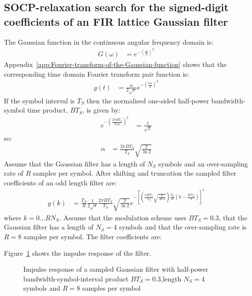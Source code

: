 \documentclass[a4paper,twoside,10pt,english]{report}
\begin{document}
\subsection{\label{sec:SOCP-relaxation-search-signed-digit-coefficients-FIR-Gaussian}SOCP-relaxation search for the signed-digit coefficients of an FIR lattice Gaussian filter}
The Gaussian function in the continuous angular frequency domain is:
\begin{align*}
  G\left(\omega\right)&=e^{-\left(\frac{\omega}{\alpha}\right)^{2}}
\end{align*}
Appendix~\ref{app:Fourier-transform-of-the-Gaussian-function} shows that
the corresponding time domain Fourier transform pair function is:
\begin{align*}
  g\left(t\right)&=\frac{\alpha}{2\sqrt{\pi}}e^{-\left(\frac{t\alpha}{2}\right)^{2}}
\end{align*}
If the symbol interval is $T_{S}$ then the normalised one-sided half-power
bandwidth-symbol time product, $BT_{S}$, is given by:
\begin{align*}
  e^{-\left(\frac{2\pi{}BT_{S}}{T_{S}\alpha}\right)^{2}}&=\frac{1}{\sqrt{2}}
\end{align*}
so:                                                          
\begin{align*}
  \alpha&=\frac{2\pi{}BT_{S}}{T_{S}}\sqrt{\frac{2}{\ln{}2}}
\end{align*}
Assume that the Gaussian filter has a length of $N_{S}$ symbols and an
over-sampling rate of $R$ samples per symbol. After shifting and truncation
the sampled filter coefficients of an odd length filter are:
\begin{align*}
  g\left(k\right)
  &=\frac{T_{S}}{R}\frac{1}{2\sqrt{\pi}}
    \frac{2\pi{}BT_{S}}{T_{S}}\sqrt{\frac{2}{\ln{}2}}
    e^{-\left[\left(\frac{\pi{}BT_{S}}{T_{S}}\sqrt{\frac{2}{\ln{}2}}\right)
    \frac{T_{S}}{R}\left(k-\frac{RN_{S}}{2}\right)\right]^{2}}
\end{align*}
where $k=0\ldots{}RN_{S}$.  Assume that the modulation scheme uses
$BT_{S}=0.3$, that the Gaussian filter has a length of $N_{S}=4$ symbols and
that the over-sampling rate is $R=8$ samples per symbol. The filter
coefficients are:
\begin{small}

\end{small} 
Figure~\ref{fig:socp-relaxation-gaussian-FIR-lattice-16-nbits-g0-impulse}
shows the impulse response of the filter.
\begin{figure}[!htbp]
\begin{center}
\scalebox{0.7}{}
\caption{Impulse response of a sampled Gaussian filter with half-power
  bandwidth-symbol-interval product $BT_{S}=0.3$,length $N_{S}=4$ symbols and
  $R=8$ samples per symbol}
\label{fig:socp-relaxation-gaussian-FIR-lattice-16-nbits-g0-impulse}
\end{center}
\end{figure}
\end{document}
